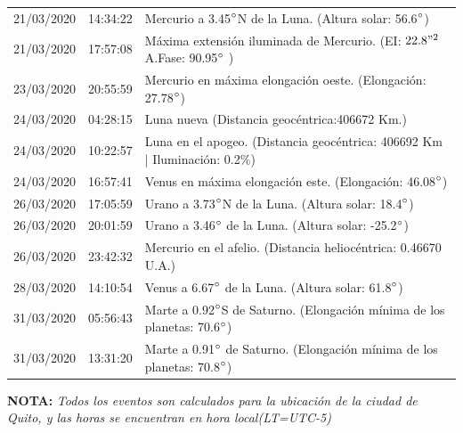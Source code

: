 \documentclass[12pt,a4paper,oneside]{article}
\begin{document}
\begin{center}
\begin{tabular}{ |l| l| l| }
21/03/2020 &  14:34:22   &  Mercurio a 3.45$\degree$N de la Luna. (Altura solar: 56.6$\degree$)	  \\
21/03/2020 &  17:57:08   &  Máxima extensión iluminada de Mercurio. (EI: $22.8"^2$ A.Fase: 90.95$\degree$ ) 	  \\
23/03/2020 &  20:55:59   &  Mercurio en máxima elongación oeste. (Elongación: 27.78$\degree$)	  \\
24/03/2020 &  04:28:15   &  Luna nueva (Distancia geocéntrica:406672 Km.)	  \\
24/03/2020 &  10:22:57   &  Luna en el apogeo. (Distancia geocéntrica: 406692 Km | Iluminación: 0.2\%)	  \\
24/03/2020 &  16:57:41   &  Venus en máxima elongación este. (Elongación: 46.08$\degree$)	  \\
26/03/2020 &  17:05:59   &  Urano a 3.73$\degree$N de la Luna. (Altura solar: 18.4$\degree$)	  \\
26/03/2020 &  20:01:59   &  Urano a 3.46$\degree$ de la Luna. (Altura solar: -25.2$\degree$)	  \\
26/03/2020 &  23:42:32   &  Mercurio en el afelio. (Distancia heliocéntrica: 0.46670 U.A.)	  \\
28/03/2020 &  14:10:54   &  Venus a 6.67$\degree$ de la Luna. (Altura solar: 61.8$\degree$)	  \\ 
31/03/2020 &  05:56:43   &  Marte a 0.92$\degree$S de Saturno. (Elongación mínima de los planetas: 70.6$\degree$)	  \\
31/03/2020 &  13:31:20   &  Marte a 0.91$\degree$ de Saturno. (Elongación mínima de los planetas: 70.8$\degree$)	\\
\hline
\end{tabular}
\end{center}
\vspace{1cm}
\textbf{NOTA:  }\textit{Todos los eventos son calculados para la ubicaci\'on de la ciudad de Quito, y las horas se encuentran en hora local(LT=UTC-5)}
\vspace{0.7cm}
\newpage
\end{document}
